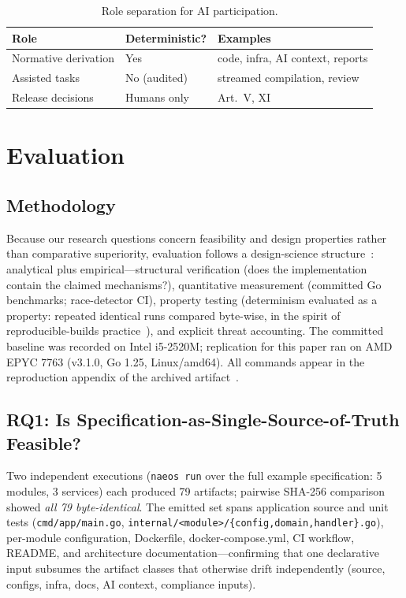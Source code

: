 \documentclass[sigconf,nonacm]{acmart}
\begin{document}
\begin{table}[t]
\centering
\caption{Role separation for AI participation.}
\label{tab:roles}
\small
\begin{tabular}{@{}lll@{}}
\toprule
\textbf{Role} & \textbf{Deterministic?} & \textbf{Examples}\\
\midrule
Normative derivation & Yes & code, infra, AI context, reports\\
Assisted tasks & No (audited) & streamed compilation, review\\
Release decisions & Humans only & Art.\ V, XI\\
\bottomrule
\end{tabular}
\end{table}

\section{Evaluation}
\label{sec:eval}

\subsection{Methodology}
Because our research questions concern feasibility and design properties rather than comparative superiority, evaluation follows a design-science structure~\cite{hevner2004dsr}: analytical plus empirical---structural verification (does the implementation contain the claimed mechanisms?), quantitative measurement (committed Go benchmarks; race-detector CI), property testing (determinism evaluated as a property: repeated identical runs compared byte-wise, in the spirit of reproducible-builds practice~\cite{lamb2022reproducible}), and explicit threat accounting. The committed baseline was recorded on Intel i5-2520M; replication for this paper ran on AMD EPYC 7763 (v3.1.0, Go 1.25, Linux/amd64). All commands appear in the reproduction appendix of the archived artifact~\cite{naeos2026artifact}.

\subsection{RQ1: Is Specification-as-Single-Source-of-Truth Feasible?}
Two independent executions (\texttt{naeos run} over the full example specification: 5 modules, 3 services) each produced 79 artifacts; pairwise SHA-256 comparison showed \emph{all 79 byte-identical}. The emitted set spans application source and unit tests (\texttt{cmd/app/main.go}, \texttt{internal/<module>/\{config,domain,handler\}.go}), per-module configuration, Dockerfile, docker-compose.yml, CI workflow, README, and architecture documentation---confirming that one declarative input subsumes the artifact classes that otherwise drift independently (source, configs, infra, docs, AI context, compliance inputs).
\end{document}
